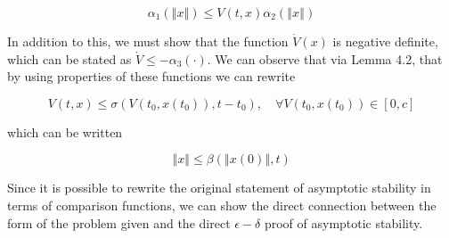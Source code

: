 $$
\alpha_1(\left\Vert x \right\Vert) \leq V(t,x) \alpha_2(\left\Vert x \right\Vert)
$$

\noindent In addition to this, we must show that the function $\dot{V}(x)$ is negative definite, which can be stated as $\dot{V} \leq -\alpha_3(\cdot)$. We can observe that via Lemma 4.2, that by using properties of these functions we can rewrite

$$
V(t,x) \leq \sigma(V(t_0, x(t_0)), t- t_0), \quad \forall V(t_0, x(t_0)) \in [0,c]
$$

\noindent which can be written

$$
\left\Vert x \right\Vert \leq \beta(\left\Vert x(0)\right\Vert, t)
$$

Since it is possible to rewrite the original statement of asymptotic stability in terms of comparison functions, we can show the direct connection between the form of the problem given and the direct $\epsilon-\delta$ proof of asymptotic stability.
